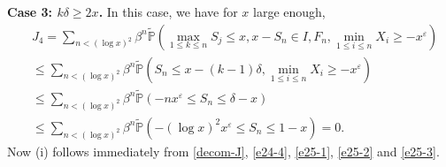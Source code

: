 \documentclass[11pt]{article}
\numberwithin{equation}{section}
\begin{document}
\noindent
{\bf Case 3: $k\delta \geq 2x$.}  In this case, we have for $x$ large enough,
\begin{align}\label{e25-3}
	&J_4 = \sum_{n<(\log x)^2} \beta^{n}\widetilde{\mathbb{P}}\left(\max_{1\leq k \leq n} S_j \leq x, x-S_n\in I, F_n, \min_{1\leq i\leq n} X_i\geq -x^{\varepsilon}\right) \nonumber\\
	& \leq \sum_{n<(\log x)^2} \beta^{n}\widetilde{\mathbb{P}}\left( S_n\leq x-(k-1)\delta, \min_{1\leq  i\leq n} X_i\geq -x^{\varepsilon}\right) \nonumber\\
	& \leq \sum_{n<(\log x)^2} \beta^{n}\widetilde{\mathbb{P}}\left( -nx^{\varepsilon}\leq S_n\leq \delta -x\right) \nonumber\\
	& \leq  \sum_{n<(\log x)^2} \beta^{n} \widetilde{\mathbb{P}}\left( -(\log x)^2x^{\varepsilon}\leq S_n\leq 1 -x\right) =0.
\end{align}
Now (i) follows immediately from \eqref{decom-J}, \eqref{e24-4}, \eqref{e25-1}, \eqref{e25-2} and \eqref{e25-3}.
\end{document}
